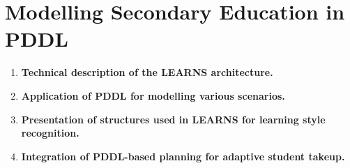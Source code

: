 \section{Modelling Secondary Education in PDDL}
\begin{enumerate}
    \item \textbf{Technical description of the LEARNS architecture.}
    \item \textbf{Application of PDDL for modelling various scenarios.}
    \item \textbf{Presentation of structures used in LEARNS for learning style recognition.}
    \item \textbf{Integration of PDDL-based planning for adaptive student takeup.}
\end{enumerate}
